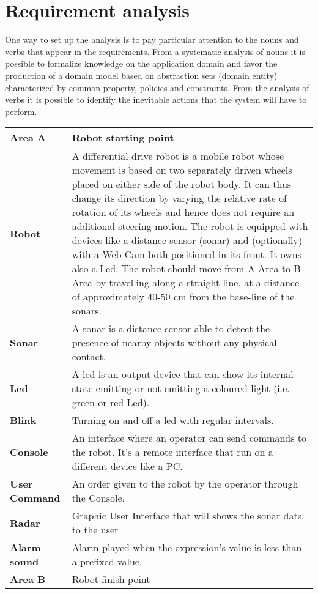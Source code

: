 \section{Requirement analysis}
One way to set up the analysis is to pay particular attention to the nouns and verbs that appear in the requirements. From a systematic analysis of nouns it is possible to formalize knowledge on the application domain and favor the production of a domain model based on abstraction sets (domain entity) characterized by common property, policies and constraints. From the analysis of verbs it is possible to identify the inevitable actions that the system will have to perform.
\begin{minipage}{\linewidth}
\centering
{} \label{tab:title} 
\end{minipage}
\begin{tabular}{| l | p{10cm} |}
\hline
\textbf{Area A} & Robot starting point \\ \hline
\textbf{Robot} & A differential drive robot is a mobile robot whose movement is based on two separately driven wheels placed on either side of the robot body. It can thus change its direction by varying the relative rate of rotation of its wheels and hence does not require an additional steering motion. The robot is equipped with devices like a distance sensor (sonar) and (optionally) with a Web Cam both positioned in its front. It owns also a Led. The robot should move from A Area to B Area by travelling along a straight line, at a distance of approximately 40-50 cm from the base-line of the sonars. \\ \hline
\textbf{Sonar} & A sonar is a distance sensor able to detect the presence of nearby objects without any physical contact. \\ \hline
\textbf{Led} & A led is an output device that can show its internal state emitting or not emitting a coloured light (i.e. green or red Led). \\ \hline
\textbf{Blink} & Turning on and off a led with regular intervals. \\ \hline
\textbf{Console} & An interface where an operator can send commands to the robot. It's a remote interface that run on a different device like a PC.\\ \hline
\textbf{User Command} & An order given to the robot by the operator through the Console. \\ \hline
\textbf{Radar} & Graphic User Interface that will shows the sonar data to the user \\ \hline
\textbf{Alarm sound} & Alarm played when the expression's value is less than a prefixed value.\\ \hline
\textbf{Area B} & Robot finish point \\ \hline
\end{tabular}



